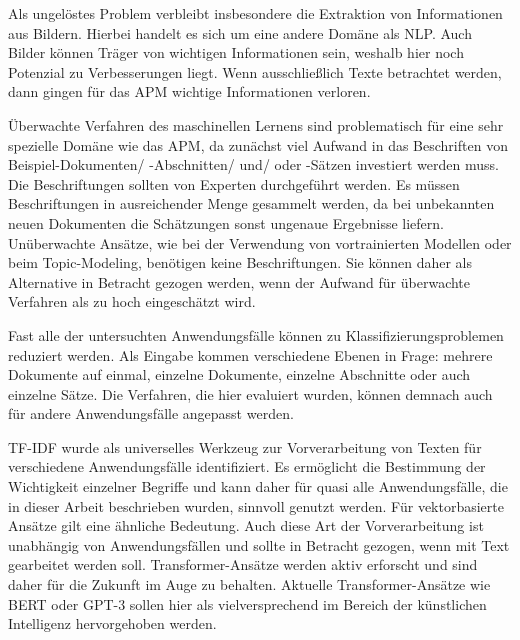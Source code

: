 Als ungelöstes Problem verbleibt insbesondere die Extraktion von Informationen aus Bildern. Hierbei handelt es sich um eine andere Domäne als NLP. Auch Bilder können Träger von wichtigen Informationen sein, weshalb hier noch Potenzial zu Verbesserungen liegt. Wenn ausschließlich Texte betrachtet werden, dann gingen für das APM wichtige Informationen verloren.

Überwachte Verfahren des maschinellen Lernens sind problematisch für eine sehr spezielle Domäne wie das APM, da zunächst viel Aufwand in das Beschriften von Beispiel-Dokumenten/ -Abschnitten/ und/ oder -Sätzen investiert werden muss. Die Beschriftungen sollten von Experten durchgeführt werden. Es müssen Beschriftungen in ausreichender Menge gesammelt werden, da bei unbekannten neuen Dokumenten die Schätzungen sonst ungenaue Ergebnisse liefern. Unüberwachte Ansätze, wie bei der Verwendung von vortrainierten Modellen oder beim Topic-Modeling, benötigen keine Beschriftungen. Sie können daher als Alternative in Betracht gezogen werden, wenn der Aufwand für überwachte Verfahren als zu hoch eingeschätzt wird. 

Fast alle der untersuchten Anwendungsfälle können zu Klassifizierungsproblemen reduziert werden. Als Eingabe kommen verschiedene Ebenen in Frage: mehrere Dokumente auf einmal, einzelne Dokumente, einzelne Abschnitte oder auch einzelne Sätze. Die Verfahren, die hier evaluiert wurden, können demnach auch für andere Anwendungsfälle angepasst werden.

TF-IDF wurde als universelles Werkzeug zur Vorverarbeitung von Texten für verschiedene Anwendungsfälle identifiziert. Es ermöglicht die Bestimmung der Wichtigkeit einzelner Begriffe und kann daher für quasi alle Anwendungsfälle, die in dieser Arbeit beschrieben wurden, sinnvoll genutzt werden. Für vektorbasierte Ansätze gilt eine ähnliche Bedeutung. Auch diese Art der Vorverarbeitung ist unabhängig von Anwendungsfällen und sollte in Betracht gezogen, wenn mit Text gearbeitet werden soll. Transformer-Ansätze werden aktiv erforscht und sind daher für die Zukunft im Auge zu behalten. 
Aktuelle Transformer-Ansätze wie BERT oder GPT-3 sollen hier als vielversprechend im Bereich der künstlichen Intelligenz hervorgehoben werden.
